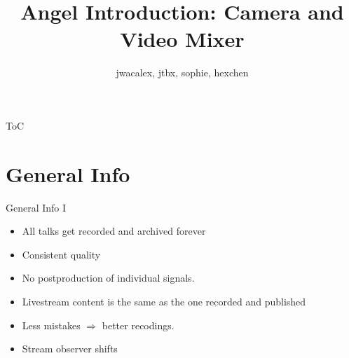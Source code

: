 \documentclass[aspectratio=169]{beamer}
\title{Angel Introduction: Camera and Video Mixer}
\author{jwacalex, jtbx, sophie, hexchen}
\institute{C3VOC@FOSSGIS2023}
\begin{document}

\maketitle

\begin{frame}{ToC}
\tableofcontents
\end{frame}


\newpage





\section{General Info}
\begin{frame}{General Info I}
	\begin{itemize}
		\item All talks get recorded and archived forever
		\item Consistent quality
		\item No postproduction of individual signals.
		\item Livestream content is the same as the one recorded and published
		\item Less mistakes $\Rightarrow$ better recodings.
		\item Stream observer shifts
	\end{itemize}
\end{frame}
\end{document}
